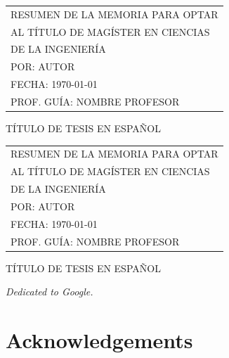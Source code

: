 \documentclass[
	12pt,
	letterpaper,
  oneside
  ]{book}
\makeatletter
\newenvironment{preliminary}%
  {\pagestyle{plain}\pagenumbering{roman}}%
  {\cleardoublepage\pagenumbering{arabic}}
\newenvironment{dedication}%
  {
  \if@openright\cleardoublepage\else\clearpage\fi
  \vspace*{\stretch{1}}
  \itshape
  \raggedleft
  \begingroup}%
  {\par\vspace{\stretch{3}}\endgroup\newpage}
\newenvironment{acknowledgements}%
  {\if@openright\cleardoublepage\else\clearpage\fi

  \chapter*{Acknowledgements}

   \begingroup}%
  {\par\endgroup\newpage}
\makeatother
\begin{document}
  \newpage
  
  \begin{preliminary}
  
  
  \setcounter{page}{2}

  \begin{tabular}{l}
		RESUMEN DE LA MEMORIA PARA OPTAR \\
		AL TÍTULO DE MAGÍSTER EN CIENCIAS \\
		DE LA INGENIERÍA \\
		POR: \MakeUppercase{Autor} \\
		FECHA: \MakeUppercase{\today} \\
		PROF. GUÍA: NOMBRE PROFESOR
	\end{tabular}

  \begin{center}
    \MakeUppercase{Título de tesis en español}
  \end{center}
  \lipsum[1-2]

  \newpage

  \begin{tabular}{l}
		RESUMEN DE LA MEMORIA PARA OPTAR \\
		AL TÍTULO DE MAGÍSTER EN CIENCIAS \\
		DE LA INGENIERÍA \\
		POR: \MakeUppercase{Autor} \\
		FECHA: \MakeUppercase{\today} \\
		PROF. GUÍA: NOMBRE PROFESOR
	\end{tabular}

  \begin{center}
    \MakeUppercase{Título de tesis en español}
  \end{center}
  \lipsum[1-2]

  \newpage

  \begin{dedication}
    Dedicated to Google.
  \end{dedication}

  \newpage

  \begin{acknowledgements}
    \lipsum[1-2]
  \end{acknowledgements}

  \tableofcontents

  \listoftables

  \listoffigures

\end{preliminary}




\end{document}
